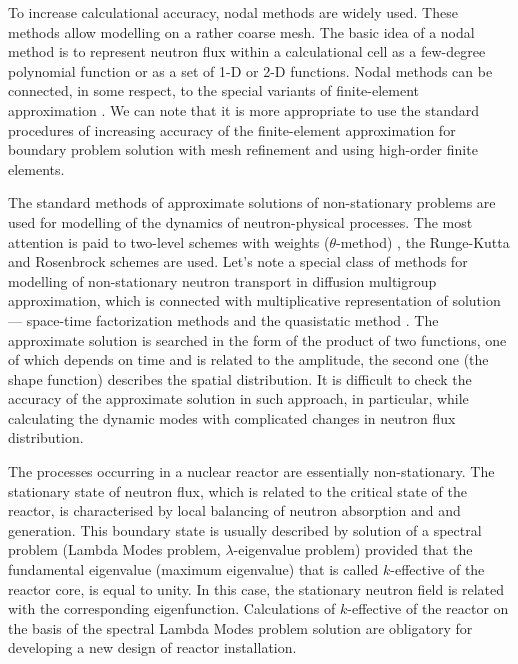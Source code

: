 \documentclass{aip-cp}
\begin{document}
To increase calculational accuracy, nodal methods are widely used. These methods allow modelling on a rather coarse mesh.
The basic idea of a nodal method is to represent neutron flux within a calculational cell as a few-degree polynomial function or as a set of 1-D or 2-D functions. Nodal methods can be connected, in some respect, to the special variants of finite-element approximation \cite{grossman2007nodal}. We can note that it is more appropriate to use the standard procedures of increasing accuracy of the finite-element approximation for boundary problem solution with mesh refinement and using high-order finite elements.

The standard methods of approximate solutions of non-stationary problems are used for modelling of the dynamics of neutron-physical processes. The most attention is paid to two-level schemes with weights ($\theta$-method) \cite{Ascher2008},
the Runge-Kutta and Rosenbrock schemes \cite{Butcher2008} are used.
Let's note a special class of methods for modelling of non-stationary neutron transport in diffusion multigroup approximation, which is connected with multiplicative representation of solution --- space-time factorization methods and the quasistatic method \cite{chou1990three}.
The approximate solution is searched in the form of the product of two functions, one of which depends on time and is related to the amplitude, the second one (the shape function) describes the spatial distribution. It is difficult to check the accuracy of the approximate solution in such approach, in particular, while calculating the dynamic modes with complicated changes in neutron flux distribution.

The processes occurring in a nuclear reactor are essentially non-stationary. The stationary state of neutron flux, which is related to the critical state of the reactor, is characterised by local balancing of neutron absorption and and generation. This boundary state is usually described by solution of a spectral problem (Lambda Modes problem, $\lambda$-eigenvalue problem) provided that the fundamental eigenvalue (maximum eigenvalue) that is called $k$-effective of the reactor core, is equal to unity. In this case, the stationary neutron field is related with the corresponding eigenfunction. Calculations of $k$-effective of the reactor on the basis of the spectral Lambda Modes problem solution are obligatory for developing a new design of reactor installation.

\end{document}
